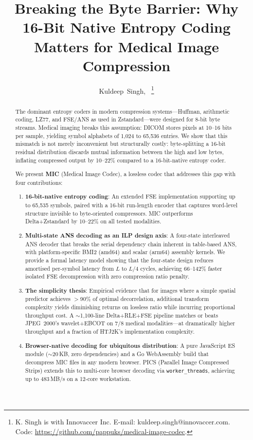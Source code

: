 \documentclass[journal]{IEEEtran}
\title{Breaking the Byte Barrier: Why 16-Bit Native Entropy Coding\\
       Matters for Medical Image Compression}
\author{Kuldeep~Singh,~\IEEEmembership{Member,~IEEE}%
\thanks{K. Singh is with Innovaccer Inc.
E-mail: kuldeep.singh@innovaccer.com.
Code: \url{https://github.com/pappuks/medical-image-codec}.}%
}
\begin{document}
\maketitle

\begin{abstract}
The dominant entropy coders in modern compression systems---Huffman,
arithmetic coding, LZ77, and FSE/ANS as used in Zstandard---were designed for
8-bit byte streams. Medical imaging breaks this assumption: DICOM stores pixels
at 10--16 bits per sample, yielding symbol alphabets of 1,024 to 65,536
entries. We show that this mismatch is not merely inconvenient but structurally
costly: byte-splitting a 16-bit residual distribution discards mutual
information between the high and low bytes, inflating compressed output by
10--22\% compared to a 16-bit-native entropy coder.

We present \textbf{MIC} (Medical Image Codec), a lossless codec that addresses
this gap with four contributions:
\begin{enumerate}
  \item \textbf{16-bit-native entropy coding}: An extended FSE implementation
  supporting up to 65,535 symbols, paired with a 16-bit run-length encoder that
  captures word-level structure invisible to byte-oriented compressors. MIC
  outperforms Delta+Zstandard by 10--22\% on all tested modalities.

  \item \textbf{Multi-state ANS decoding as an ILP design axis}: A four-state
  interleaved ANS decoder that breaks the serial dependency chain inherent in
  table-based ANS, with platform-specific BMI2 (amd64) and scalar (arm64)
  assembly kernels. We provide a formal latency model showing that the four-state
  design reduces amortised per-symbol latency from $L$ to $L/4$ cycles,
  achieving 66--142\% faster isolated FSE decompression with zero compression
  ratio penalty.

  \item \textbf{The simplicity thesis}: Empirical evidence that for images where
  a simple spatial predictor achieves $>$90\% of optimal decorrelation,
  additional transform complexity yields diminishing returns on lossless ratio
  while incurring proportional throughput cost. A $\sim$1,100-line
  Delta+RLE+FSE pipeline matches or beats JPEG~2000's wavelet+EBCOT on 7/8
  medical modalities---at dramatically higher throughput and a fraction of
  HTJ2K's implementation complexity.

  \item \textbf{Browser-native decoding for ubiquitous distribution}: A pure
  JavaScript ES module ($\sim$20\,KB, zero dependencies) and a Go WebAssembly
  build that decompress MIC files in any modern browser. PICS (Parallel Image
  Compressed Strips) extends this to multi-core browser decoding via
  \texttt{worker\_threads}, achieving up to 483\,MB/s on a 12-core workstation.
\end{enumerate}


\end{abstract}
\end{document}
